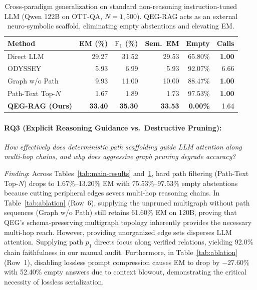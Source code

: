 \documentclass[runningheads]{llncs}
\begin{document}
\enlargethispage{3.0\baselineskip}
\begin{table}[t]
\vspace{-2mm}
\caption{Cross-paradigm generalization on standard non-reasoning instruction-tuned LLM (Qwen 122B on OTT-QA, $N=1{,}500$). QEG-RAG acts as an external neuro-symbolic scaffold, eliminating empty abstentions and elevating EM.}
\label{tab:qwen-results}
\centering
\scriptsize
\renewcommand{\arraystretch}{0.88}
\setlength{\tabcolsep}{5.5pt}
\begin{tabular}{@{}lrrrrr@{}}
\toprule
Method & EM (\%) & $\text{F}_1$ (\%) & Sem.\ EM & Empty & Calls \\
\midrule
Direct LLM                       & 29.27 & 31.52 & 29.53 & 65.80\% & \textbf{1.00} \\
ODYSSEY~\cite{agarwal2025hybrid} & 5.93  & 6.99  & 5.93  & 92.07\% & 6.66 \\
Graph w/o Path                   & 9.93  & 11.00 & 10.00 & 88.47\% & \textbf{1.00} \\
Path-Text Top-$N$                & 1.67  & 1.89  & 1.73  & 97.53\% & \textbf{1.00} \\
\textbf{QEG-RAG (Ours)}          & \textbf{33.40} & \textbf{35.30} & \textbf{33.53} & \textbf{0.00\%} & 1.64 \\
\bottomrule
\end{tabular}
\vspace{-2.5mm}
\end{table}

\paragraph{RQ3 (Explicit Reasoning Guidance vs.\ Destructive Pruning):}
\emph{How effectively does deterministic path scaffolding guide LLM attention along multi-hop chains, and why does aggressive graph pruning degrade accuracy?}

\emph{Finding}: Across Tables~\ref{tab:main-results} and~\ref{tab:qwen-results}, hard path filtering (Path-Text Top-$N$) drops to 1.67\%--13.20\% EM with 75.53\%--97.53\% empty abstentions because cutting peripheral edges severs multi-hop reasoning chains. In Table~\ref{tab:ablation} (Row~6), supplying the unpruned multigraph without path sequences (Graph w/o Path) still retains 61.60\% EM on 120B, proving that QEG's schema-preserving multigraph topology inherently provides the necessary multi-hop reach. However, providing unorganized edge sets disperses LLM attention. Supplying path $p_1$ directs focus along verified relations, yielding 92.0\% chain faithfulness in our manual audit. Furthermore, in Table~\ref{tab:ablation} (Row~1), disabling lossless prompt compression causes EM to drop by $-27.60\%$ with 52.40\% empty answers due to context blowout, demonstrating the critical necessity of lossless serialization.
\end{document}
